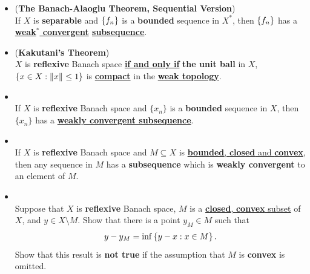\documentclass[11pt]{article}
\begin{document}
\begin{itemize}
\item \begin{corollary} (\textbf{The Banach-Alaoglu Theorem, Sequential Version}) \citep{rynne2007linear}\\
If $X$ is \textbf{separable} and $\left\{f_n\right\}$ is a \textbf{bounded} sequence in $X^{*}$, then  $\left\{f_n\right\}$ has a \textbf{\underline{weak$^{*}$ convergent} \underline{subsequence}}.
\end{corollary}

\item \begin{theorem}(\textbf{Kakutani's Theorem}) \citep{rynne2007linear}\\
$X$ is \textbf{reflexive} Banach space \underline{\textbf{if and only if}} \textbf{the unit ball} in $X$, $\left\{x \in X: \left\|x\right\|_{}\le 1\right\}$ is \underline{\textbf{compact}} in the \underline{\textbf{weak topology}}.
\end{theorem}

\item \begin{corollary} \citep{rynne2007linear}\\
If $X$ is \textbf{reflexive} Banach space and $\{x_n\}$ is a \textbf{bounded} sequence in $X$, then $\{x_n\}$ has a \textbf{\underline{weakly convergent subsequence}}.
\end{corollary}

\item \begin{corollary}\citep{rynne2007linear}\\
If $X$ is \textbf{reflexive} Banach space and $M \subseteq X$ is \underline{\textbf{bounded}, \textbf{closed} and \textbf{convex}}, then any sequence
in $M$ has a \textbf{subsequence} which is \textbf{weakly convergent} to an element of $M$.
\end{corollary}

\item \begin{exercise}\citep{rynne2007linear}\\
Suppose that $X$ is \textbf{reflexive} Banach space, $M$ is a \underline{\textbf{closed}, \textbf{convex} subset} of $X$, and
$y \in X \setminus M$.  Show that there is a point $y_M \in M$ such that
\begin{align*}
y - y_M = \inf\left\{y- x: x \in M\right\}.
\end{align*}
Show that this result is \textbf{not true} if the assumption that $M$ is \textbf{convex} is omitted.
\end{exercise}


\end{itemize}
\end{document}
